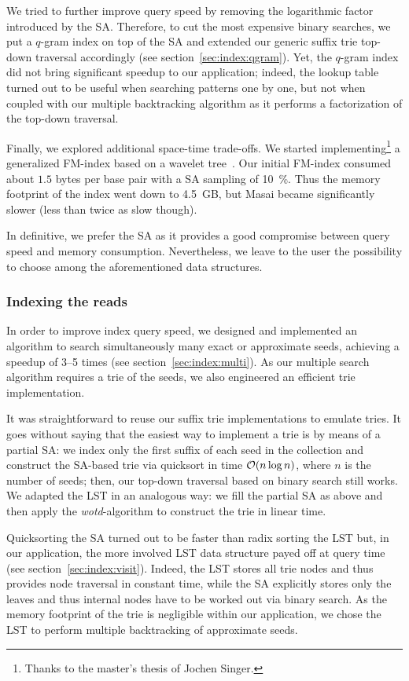 We tried to further improve query speed by removing the logarithmic factor introduced by the SA.
Therefore, to cut the most expensive binary searches, we put a $q$-gram index on top of the SA and extended our generic suffix trie top-down traversal accordingly (see section~\ref{sec:index:qgram}).
Yet, the $q$-gram index did not bring significant speedup to our application;
indeed, the lookup table turned out to be useful when searching patterns one by one, but not when coupled with our multiple backtracking algorithm as it performs a factorization of the top-down traversal.

Finally, we explored additional space-time trade-offs.
We started implementing\footnote{Thanks to the master's thesis of Jochen Singer.} a generalized FM-index based on a wavelet tree~\citep{Grossi2003}.
Our initial FM-index consumed about $1.5$ bytes per base pair with a SA sampling of 10~\%.
Thus the memory footprint of the index went down to 4.5~GB, but Masai became significantly slower (less than twice as slow though).

In definitive, we prefer the SA as it provides a good compromise between query speed and memory consumption.
Nevertheless, we leave to the user the possibility to choose among the aforementioned data structures.

\subsubsection{Indexing the reads}

In order to improve index query speed, we designed and implemented an algorithm to search simultaneously many exact or approximate seeds, achieving a speedup of 3--5 times (see section~\ref{sec:index:multi}).
As our multiple search algorithm requires a trie of the seeds, we also engineered an efficient trie implementation.

It was straightforward to reuse our suffix trie implementations to emulate tries.
It goes without saying that the easiest way to implement a trie is by means of a partial SA:
we index only the first suffix of each seed in the collection and construct the SA-based trie via quicksort in time $\mathcal{O}(n \log n)$, where $n$ is the number of seeds; then, our top-down traversal based on binary search still works.
We adapted the LST in an analogous way: we fill the partial SA as above and then apply the \emph{wotd}-algorithm \citep{Giegerich1999} to construct the trie in linear time.

Quicksorting the SA turned out to be faster than radix sorting the LST but, in our application, the more involved LST data structure payed off at query time (see section~\ref{sec:index:visit}).
Indeed, the LST stores all trie nodes and thus provides node traversal in constant time, while the SA explicitly stores only the leaves and thus internal nodes have to be worked out via binary search.
As the memory footprint of the trie is negligible within our application, we chose the LST to perform multiple backtracking of approximate seeds.

